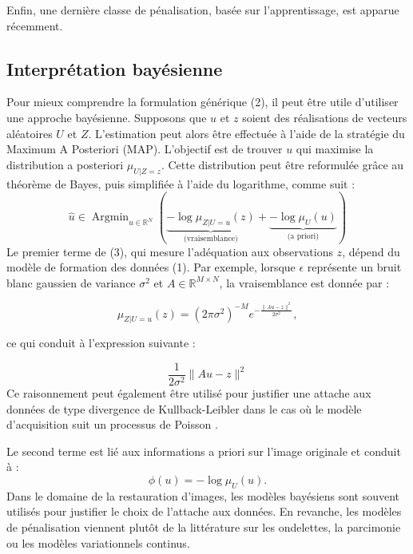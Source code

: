 \documentclass[a4paper, 12pt]{report} %
\begin{document}
Enfin, une dernière classe de pénalisation, basée sur l'apprentissage, est apparue récemment.


\subsection{Interprétation bayésienne}
Pour mieux comprendre la formulation générique (2), il peut être utile d’utiliser une approche bayésienne. Supposons que \( u \) et \( z \) soient des réalisations de vecteurs aléatoires \( U \) et \( Z \). L’estimation peut alors être effectuée à l’aide de la stratégie du Maximum A Posteriori (MAP). L’objectif est de trouver \( u \) qui maximise la distribution a posteriori \( \mu_{U|Z=z} \). Cette distribution peut être reformulée grâce au théorème de Bayes, puis simplifiée à l’aide du logarithme, comme suit :
\[
\hat{u} \in \operatorname{Argmin}_{u \in \mathbb{R}^N} \left( 
\underbrace{-\log \mu_{Z|U=u}(z)}_{\text{(vraisemblance)}} + 
\underbrace{-\log \mu_U(u)}_{\text{(a priori)}}
\right)
\]
Le premier terme de (3), qui mesure l’adéquation aux observations \( z \), dépend du modèle de formation des données (1). Par exemple, lorsque \( \epsilon \) représente un bruit blanc gaussien de variance \( \sigma^2 \) et \( A \in \mathbb{R}^{M \times N} \), la vraisemblance est donnée par :

\begin{equation}
\mu_{Z|U=u}(z) = (2\pi\sigma^2)^{-M} e^{-\frac{\|Au - z\|^2}{2\sigma^2}},
\end{equation}

ce qui conduit à l’expression suivante :

\begin{equation}
\frac{1}{2\sigma^2} \|Au - z\|^2
\end{equation}
Ce raisonnement peut également être utilisé pour justifier une attache aux données de type divergence de Kullback-Leibler dans le cas où le modèle d’acquisition suit un processus de Poisson \cite{pustelnik2023evolution}.

Le second terme est lié aux informations a priori sur l’image originale et conduit à :
\begin{equation}
\phi(u) = -\log \mu_U(u).
\end{equation}
Dans le domaine de la restauration d’images, les modèles bayésiens sont souvent utilisés pour justifier le choix de l’attache aux données. En revanche, les modèles de pénalisation viennent plutôt de la littérature sur les ondelettes, la parcimonie ou les modèles variationnels continus.
\end{document}
